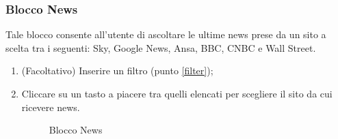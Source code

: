 \subsubsection{Blocco News}
Tale blocco consente all'utente di ascoltare le ultime news prese da un sito a scelta tra i seguenti: Sky, Google News, Ansa, BBC, CNBC e Wall Street.
\begin{enumerate}
	\item (Facoltativo) Inserire un filtro (punto \ref{filter});
	\item Cliccare su un tasto a piacere tra quelli elencati per scegliere il sito da cui ricevere news.
	\begin{figure}[!ht]
		\centering
		\caption{Blocco News}
	\end{figure}
\end{enumerate}
\newpage

